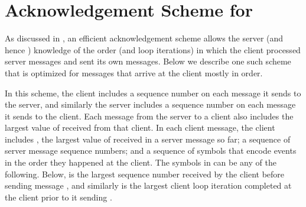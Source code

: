 %

\section{Acknowledgement Scheme for \xpilot}
\label{app:acks}

As discussed in , an efficient acknowledgement
scheme allows the server (and hence \verifier) knowledge of the order
(and loop iterations) in which the client processed server messages
and sent its own messages.  Below we describe one such scheme that is
optimized for messages that arrive at the client mostly in order.

In this scheme, the \xpilot client includes a sequence number \cToSNbr
on each message it sends to the server, and similarly the server
includes a sequence number \sToCNbr on each message it sends to the
client.  Each message from the server to a client also includes the
largest value of \cToSNbr received from that client.  In each client
message, the client includes \cToSAckd, the largest value of \cToSNbr
received in a server message so far; a sequence \lateMsgs{} of server
message sequence numbers; and a sequence \symbSeq{} of symbols that
encode events in the order they happened at the client.  The symbols
in \symbSeq{} can be any of the following.  Below, \sToCAckd is the
largest sequence number \sToCNbr received by the client before sending
message \cToSAckd, and similarly \loopAckd is the largest client loop iteration
completed at the client prior to it sending \cToSAckd.

